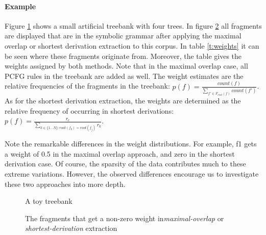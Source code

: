\paragraph{Example}
\FloatBarrier
Figure \ref{f:treebank} shows a small artificial treebank with four trees. In figure \ref{f:fragments} all fragments are displayed that are in the symbolic grammar after applying the maximal overlap or shortest derivation extraction to this corpus. In table \ref{t:weights} it can be seen where these fragments originate from. Moreover, the table gives the weights assigned by both methods. Note that in the maximal overlap case, all PCFG rules in the treebank are added as well. The weight estimates are the relative frequencies of the fragments in the treebank: $p(f)=\frac{count(f)}{\sum_{f'\in F_{root}(f)} count(f')}$\cite{sangati2011}. As for the shortest derivation extraction, the weights are determined as the relative frequency of occurring in shortest derivations: $p(f)=\frac{r_c}{\sum_{k\in \{1\ldots N\}:root(f_k)=root(f_j)} r_k}$\cite{zollmann2005}.

Note the remarkable differences in the weight distributions. For example, f1 gets a weight of 0.5 in the maximal overlap approach, and zero in the shortest derivation case. Of course, the sparsity of the data contributes much to these extreme variations. However, the observed differences encourage us to investigate these two approaches into more depth.


\begin{figure}[h!]
\center 
\caption{A toy treebank} \label{f:treebank}
\end{figure}

\begin{figure}[h!]
\center 
\caption{The fragments that get a non-zero weight in\emph{maximal-overlap} or \emph{shortest-derivation} extraction}
\label{f:fragments}
\end{figure}

